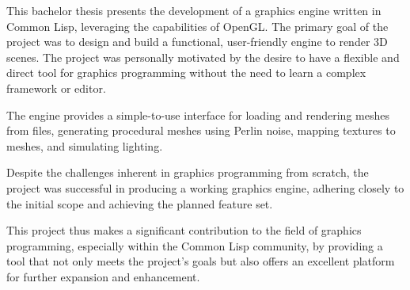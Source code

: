This bachelor thesis presents the development of a graphics engine written in Common Lisp,
leveraging the capabilities of OpenGL.
The primary goal of the project was to design and build a functional,
user-friendly engine to render 3D scenes.
The project was personally motivated by the desire to have a flexible and direct tool for graphics programming without the need to learn a complex framework or editor.

The engine provides a simple-to-use interface for loading and rendering meshes from files,
generating procedural meshes using Perlin noise,
mapping textures to meshes,
and simulating lighting.

Despite the challenges inherent in graphics programming from scratch,
the project was successful in producing a working graphics engine,
adhering closely to the initial scope and achieving the planned feature set.

This project thus makes a significant contribution to the field of graphics programming,
especially within the Common Lisp community,
by providing a tool that not only meets the project's goals but also offers an excellent platform for further expansion and enhancement.

